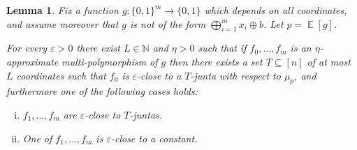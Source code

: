 \documentclass{article}
\newtheorem{lemma}[theorem]{Lemma}
\theoremstyle{definition}
\theoremstyle{remark}
\DeclareMathOperator*{\E}{\mathbb{E}}
\newcommand\eps{\varepsilon}
\renewcommand\epsilon{\eps}
\begin{document}
\begin{lemma} \label{lem:f-junta-multi-all}
Fix a function $g\colon \{0,1\}^m \to \{0,1\}$ which depends on all coordinates, and assume moreover that $g$ is not of the form $\bigoplus_{i=1}^m x_i \oplus b$. Let $p = \E[g]$.

For every $\epsilon > 0$ there exist $L \in \mathbb{N}$ and $\eta > 0$ such that if $f_0,\ldots,f_m$ is an $\eta$-approximate multi-polymorphism of $g$ then there exists a set $T \subseteq [n]$ of at most $L$ coordinates such that $f_0$ is $\epsilon$-close to a $T$-junta with respect to $\mu_p$, and furthermore one of the following cases holds:
\begin{enumerate}[(i)]
\item $f_1,\ldots,f_m$ are $\epsilon$-close to $T$-juntas.
\item One of $f_1,\ldots,f_m$ is $\epsilon$-close to a constant.
\end{enumerate}
\end{lemma}
\end{document}
